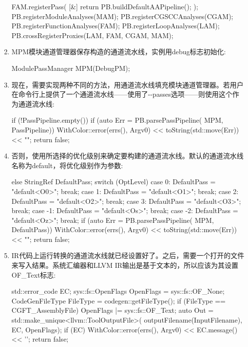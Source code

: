 \begin{enumerate}
\begin{cpp}
FAM.registerPass(
    [&] { return PB.buildDefaultAAPipeline(); });
PB.registerModuleAnalyses(MAM);
PB.registerCGSCCAnalyses(CGAM);
PB.registerFunctionAnalyses(FAM);
PB.registerLoopAnalyses(LAM);
PB.crossRegisterProxies(LAM, FAM, CGAM, MAM);
\end{cpp}

\item
MPM模块通道管理器保存构造的通道流水线，实例用debug标志初始化:

\begin{cpp}
ModulePassManager MPM(DebugPM);
\end{cpp}

\item
现在，需要实现两种不同的方法，用通道流水线填充模块通道管理器。若用户在命令行上提供了一个通道流水线——使用了-{}-passes选项——则使用这个作为通道流水线:

\begin{cpp}
if (!PassPipeline.empty()) {
    if (auto Err = PB.parsePassPipeline(
    MPM, PassPipeline)) {
        WithColor::error(errs(), Argv0)
        << toString(std::move(Err)) << "\n";
        return false;
    }
}
\end{cpp}

\item
否则，使用所选择的优化级别来确定要构建的通道流水线。默认的通道流水线名称为default，将优化级别作为参数:

\begin{cpp}
else {
    StringRef DefaultPass;
    switch (OptLevel) {
        case 0: DefaultPass = "default<O0>"; break;
        case 1: DefaultPass = "default<O1>"; break;
        case 2: DefaultPass = "default<O2>"; break;
        case 3: DefaultPass = "default<O3>"; break;
        case -1: DefaultPass = "default<Os>"; break;
        case -2: DefaultPass = "default<Oz>"; break;
    }
    if (auto Err = PB.parsePassPipeline(
            MPM, DefaultPass)) {
        WithColor::error(errs(), Argv0)
        << toString(std::move(Err)) << "\n";
        return false;
    }
}
\end{cpp}


\item
IR代码上运行转换的通道流水线就已经设置好了。之后，需要一个打开的文件来写入结果。系统汇编器和LLVM IR输出是基于文本的，所以应该为其设置OF\_Text标志:

\begin{cpp}
std::error_code EC;
sys::fs::OpenFlags OpenFlags = sys::fs::OF_None;
CodeGenFileType FileType = codegen::getFileType();
if (FileType == CGFT_AssemblyFile)
    OpenFlags |= sys::fs::OF_Text;
auto Out = std::make_unique<llvm::ToolOutputFile>(
    outputFilename(InputFilename), EC, OpenFlags);
if (EC) {
    WithColor::error(errs(), Argv0)
        << EC.message() << '\n';
    return false;
}
\end{cpp}


\end{enumerate}

